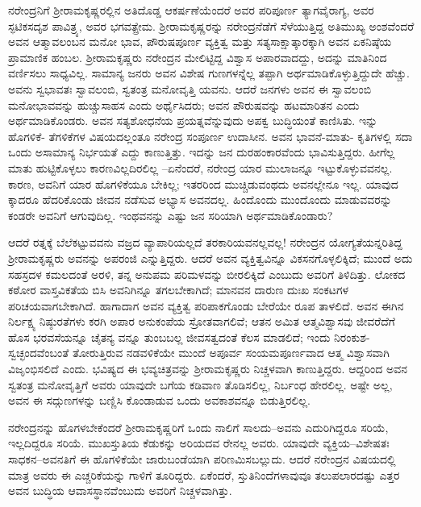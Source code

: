 ನರೇಂದ್ರನಿಗೆ ಶ್ರೀರಾಮಕೃಷ್ಣರಲ್ಲಿನ ಅತಿದೊಡ್ಡ ಆಕರ್ಷಣೆಯೆಂದರೆ ಅವರ ಪರಿಪೂರ್ಣ ತ್ಯಾಗವೈರಾಗ್ಯ, ಅವರ ಸ್ಫಟಿಕಸದೃಶ ಪಾವಿತ್ರ್ಯ, ಅವರ ಭಗವತ್ಪ್ರೇಮ. ಶ್ರೀರಾಮಕೃಷ್ಣರನ್ನು ನರೇಂದ್ರನೆಡೆಗೆ ಸೆಳೆಯುತ್ತಿದ್ದ ಅತಿಮುಖ್ಯ ಅಂಶವೆಂದರೆ ಅವನ ಆತ್ಮಾವಲಂಬನ ಮನೋ ಭಾವ, ಪೌರುಷಪೂರ್ಣ ವ್ಯಕ್ತಿತ್ವ ಮತ್ತು ಸತ್ಯಸಾಕ್ಷಾತ್ಕಾರಕ್ಕಾಗಿ ಅವನ ಏಕನಿಷ್ಠೆಯ ಪ್ರಾಮಾಣಿಕ ಹಂಬಲ. ಶ್ರೀರಾಮಕೃಷ್ಣರು ನರೇಂದ್ರನ ಮೇಲಿಟ್ಟಿದ್ದ ವಿಶ್ವಾಸ ಅಪಾರವಾದದ್ದು, ಅದನ್ನು ಮಾತಿನಿಂದ ವರ್ಣಿಸಲು ಸಾಧ್ಯವಿಲ್ಲ. ಸಾಮಾನ್ಯ ಜನರು ಅವನ ವಿಶೇಷ ಗುಣಗಳನ್ನೆಲ್ಲ ತಪ್ಪಾಗಿ ಅರ್ಥಮಾಡಿಕೊಳ್ಳುತ್ತಿದ್ದುದೇ ಹೆಚ್ಚು. ಅವನು ಸ್ವಭಾವತಃ ಸ್ವಾವಲಂಬಿ, ಸ್ವತಂತ್ರ ಮನೋವೃತ್ತಿ ಯವನು. ಆದರೆ ಜನಗಳು ಅವನ ಈ ಸ್ವಾವಲಂಬಿ ಮನೋಭಾವವನ್ನು ಹುಚ್ಚುಸಾಹಸ ಎಂದು ಅರ್ಥೈಸಿದರು; ಅವನ ಪೌರುಷವನ್ನು ಹಟಮಾರಿತನ ಎಂದು ಅರ್ಥಮಾಡಿಕೊಂಡರು. ಅವನ ಸತ್ಯಶೋಧನೆಯ ಪ್ರಯತ್ನವೆನ್ನುವುದು ಅಪಕ್ವ ಬುದ್ಧಿಯಂತೆ ಕಾಣಿಸಿತು. ಇನ್ನು ಹೊಗಳಿಕೆ- ತೆಗಳಿಕೆಗಳ ವಿಷಯದಲ್ಲಂತೂ ನರೇಂದ್ರ ಸಂಪೂರ್ಣ ಉದಾಸೀನ. ಅವನ ಭಾವನೆ-ಮಾತು- ಕೃತಿಗಳಲ್ಲಿ ಸದಾ ಒಂದು ಅಸಾಮಾನ್ಯ ನಿರ್ಭಯತೆ ಎದ್ದು ಕಾಣುತ್ತಿತ್ತು. ಇದನ್ನು ಜನ ದುರಹಂಕಾರವೆಂದು ಭಾವಿಸುತ್ತಿದ್ದರು. ಹೀಗೆಲ್ಲ ಮಾತು ಹುಟ್ಟಿಕೊಳ್ಳಲು ಕಾರಣವಿಲ್ಲದಿರಲಿಲ್ಲ –ಏನೆಂದರೆ, ನರೇಂದ್ರ ಯಾರ ಮುಲಾಜನ್ನೂ ಇಟ್ಟುಕೊಳ್ಳುವವನಲ್ಲ. ಕಾರಣ, ಅವನಿಗೆ ಯಾರ ಹೊಗಳಿಕೆಯೂ ಬೇಕಿಲ್ಲ; ಇತರರಿಂದ ಮುಚ್ಚಿಡುವಂಥದು ಅವನಲ್ಲೇನೂ ಇಲ್ಲ. ಯಾವುದ ಕ್ಕಾದರೂ ಹೆದರಿಕೊಂಡು ಜೀವನ ನಡೆಸುವ ಅಭ್ಯಾಸ ಅವನದಲ್ಲ. ಹಿಂದೊಂದು ಮುಂದೊಂದು ಮಾಡುವವರನ್ನು ಕಂಡರೇ ಅವನಿಗೆ ಆಗುವುದಿಲ್ಲ. ಇಂಥವನನ್ನು ಎಷ್ಟು ಜನ ಸರಿಯಾಗಿ ಅರ್ಥಮಾಡಿಕೊಂಡಾರು?

ಆದರೆ ರತ್ನಕ್ಕೆ ಬೆಲೆಕಟ್ಟುವವನು ವಜ್ರದ ವ್ಯಾಪಾರಿಯಲ್ಲದೆ ತರಕಾರಿಯವನಲ್ಲವಲ್ಲ! ನರೇಂದ್ರನ ಯೋಗ್ಯತೆಯನ್ನರಿತಿದ್ದ ಶ್ರೀರಾಮಕೃಷ್ಣರು ಅವನನ್ನು ಅಪರಂಜಿ ಎನ್ನುತ್ತಿದ್ದರು. ಆದರೆ ಅವನ ವ್ಯಕ್ತಿತ್ವವಿನ್ನೂ ವಿಕಸನಗೊಳ್ಳಲಿಕ್ಕಿದೆ; ಮುಂದೆ ಅದು ಸಹಸ್ರದಳ ಕಮಲದಂತೆ ಅರಳಿ, ತನ್ನ ಅನುಪಮ ಪರಿಮಳವನ್ನು ಬೀರಲಿಕ್ಕಿದೆ ಎಂಬುದು ಅವರಿಗೆ ತಿಳಿದಿತ್ತು. ಲೋಕದ ಕಠೋರ ವಾಸ್ತವಿಕತೆಯ ಬಿಸಿ ಅವನಿಗಿನ್ನೂ ತಗಲಬೇಕಾಗಿದೆ; ಮಾನವನ ದಾರುಣ ದುಃಖ ಸಂಕಟಗಳ ಪರಿಚಯವಾಗಬೇಕಾಗಿದೆ. ಹಾಗಾದಾಗ ಅವನ ವ್ಯಕ್ತಿತ್ವ ಪರಿಪಾಕಗೊಂಡು ಬೇರೆಯೇ ರೂಪ ತಾಳಲಿದೆ. ಅವನ ಈಗಿನ ನಿರ್ಲಕ್ಷ್ಯ ನಿಷ್ಠುರತೆಗಳು ಕರಗಿ ಅಪಾರ ಅನುಕಂಪೆಯ ಸ್ರೋತವಾಗಲಿವೆ; ಆತನ ಅಮಿತ ಆತ್ಮವಿಶ್ವಾಸವು ಜೀವರೆದೆಗೆ ಹೊಸ ಭರವಸೆಯನ್ನೂ ಚೈತನ್ಯ ವನ್ನೂ ತುಂಬಬಲ್ಲ ಜೀವಸತ್ವದಂತೆ ಕೆಲಸ ಮಾಡಲಿದೆ; ಇಂದು ನಿರಂಕುಶ-ಸ್ವಚ್ಛಂದವೆಂಬಂತೆ ತೋರುತ್ತಿರುವ ನಡವಳಿಕೆಯೇ ಮುಂದೆ ಅಪೂರ್ವ ಸಂಯಮಪೂರ್ಣವಾದ ಆತ್ಮ ವಿಶ್ವಾಸವಾಗಿ ವಿಜೃಂಭಿಸಲಿದೆ ಎಂದು. ಭವಿಷ್ಯದ ಈ ಭವ್ಯಚಿತ್ರವನ್ನು ಶ್ರೀರಾಮಕೃಷ್ಣರು ನಿಚ್ಚಳವಾಗಿ ಕಾಣುತ್ತಿದ್ದರು. ಆದ್ದರಿಂದ ಅವನ ಸ್ವತಂತ್ರ ಮನೋವೃತ್ತಿಗೆ ಅವರು ಯಾವುದೇ ಬಗೆಯ ಕಡಿವಾಣ ತೊಡಿಸಲಿಲ್ಲ, ನಿರ್ಬಂಧ ಹೇರಲಿಲ್ಲ. ಅಷ್ಟೇ ಅಲ್ಲ, ಅವನ ಈ ಸದ್ಗುಣಗಳನ್ನು ಬಣ್ಣಿಸಿ ಕೊಂಡಾಡುವ ಒಂದು ಅವಕಾಶವನ್ನೂ ಬಿಡುತ್ತಿರಲಿಲ್ಲ.

ನರೇಂದ್ರನನ್ನು ಹೊಗಳಬೇಕೆಂದರೆ ಶ್ರೀರಾಮಕೃಷ್ಣರಿಗೆ ಒಂದು ನಾಲಿಗೆ ಸಾಲದು–ಅವನು ಎದುರಿಗಿದ್ದರೂ ಸರಿಯೆ, ಇಲ್ಲದಿದ್ದರೂ ಸರಿಯೆ. ಮುಖಸ್ತುತಿಯ ಕೆಡುಕನ್ನು ಅರಿಯದವ ರೇನಲ್ಲ ಅವರು. ಯಾವುದೇ ವ್ಯಕ್ತಿಯ–ವಿಶೇಷತಃ ಸಾಧಕನ–ಅವನತಿಗೆ ಈ ಹೊಗಳಿಕೆಯೇ ಜಾರುಬಂಡೆಯಾಗಿ ಪರಿಣಮಿಸಬಲ್ಲುದು. ಆದರೆ ನರೇಂದ್ರನ ವಿಷಯದಲ್ಲಿ ಮಾತ್ರ ಅವರು ಈ ಎಚ್ಚರಿಕೆಯನ್ನು ಗಾಳಿಗೆ ತೂರಿದ್ದರು. ಏಕೆಂದರೆ, ಸ್ತುತಿನಿಂದೆಗಳಾವುವೂ ತಲುಪಲಾರದಷ್ಟು ಎತ್ತರ ಅವನ ಬುದ್ಧಿಯ ಆವಾಸಸ್ಥಾನವೆಂಬುದು ಅವರಿಗೆ ನಿಚ್ಚಳವಾಗಿತ್ತು.

